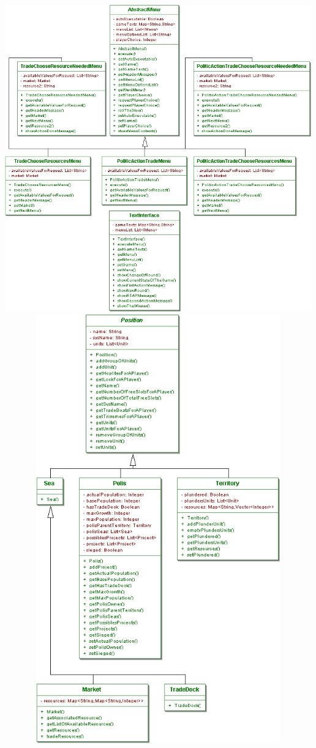 \documentclass[11 pt]{book}
\begin{document}
\begin{center}
		    \includegraphics[width=500px]{design-uml/iteration7/politicsactions2.jpg}
		    \includegraphics[width=500px, height=700px]{design-uml/iteration7/positions.jpg}

\end{center}
\end{document}

